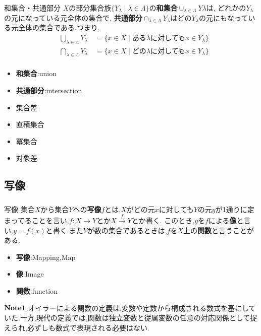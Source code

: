 \documentclass[dvipdfmx,b4j]{jsarticle}
\begin{document}
\subsubsection{}
\begin{definition}{和集合・共通部分}{}
$X$の部分集合族$\{Y_\lambda\mid\lambda\in\Lambda\}$の\textbf{和集合}$\cup_{\lambda\in\Lambda}Y\lambda$は,
どれかの$Y_\lambda$の元になっている元全体の集合で,
\textbf{共通部分}$\cap_{\lambda\in\Lambda}Y_\lambda$はどの$Y_\lambda$の元にもなっている元全体の集合である.つまり,
\begin{align*}
&\bigcup_{\lambda\in\Lambda}Y_\lambda\quad=\{x\in X\mid \text{ある}\lambda\text{に対しても}x\in Y_\lambda\}\\
&\bigcap_{\lambda\in\Lambda}Y_\lambda\quad=\{x\in X\mid \text{どの}\lambda\text{に対しても}x\in Y_\lambda\}\\
\end{align*}
\tcbline
\begin{itemize}
    \item \textbf{和集合}:union
    \item \textbf{共通部分}:intersection
\end{itemize}
\end{definition}
\begin{itemize}
\item 集合差
\item 直積集合
\item 冪集合
\item 対象差
\end{itemize}
\subsection{写像}
\subsubsection{}
\begin{definition}{写像}{}
集合$X$から集合$Y$への\textbf{写像}$f$とは,$X$がどの元$x$に対しても$Y$の元$y$が1通りに定まってることを言い,$f\colon X\to Y$とか$X\stackrel{f}{\to}Y$とか書く.
このとき,$y$を$f$による\textbf{像}と言い,$y=f(x)$と書く.また$Y$が数の集合であるときは,$f$を$X$上の\textbf{関数}と言うことがある.
\tcbline
\begin{itemize}
    \item \textbf{写像}:Mapping,Map
    \item \textbf{像}:Image
    \item \textbf{関数}:function
\end{itemize}
%
\end{definition}
\noindent $\bf{Note1}$:オイラーによる関数の定義は,変数や定数から構成される数式を基にしていた.一方,現代の定義では,関数は独立変数と従属変数の任意の対応関係として捉えられ,必ずしも数式で表現される必要はない.
\end{document}

